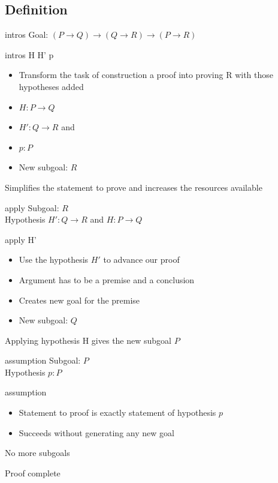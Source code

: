 \subsection{Definition}
\begin{frame}[fragile]{intros}
	Goal: $(P \rightarrow Q) \rightarrow (Q \rightarrow R) \rightarrow (P \rightarrow R)$ \\
	\medskip
	\pause
	\begin{user}
	intros H H' p
	\end{user}
	\pause
	\begin{itemize}
		\item Transform the task of construction a proof into proving R with those hypotheses added
		\pause
		\item $H:P \rightarrow Q$
		\pause
		\item $H':Q \rightarrow R$ and
		\pause
		\item $p:P$
		\pause
		\item New subgoal: $R$
	\end{itemize}
	\pause
	Simplifies the statement to prove and increases the resources available
\end{frame}
\begin{frame}[fragile]{apply}
	Subgoal: $R$\\
	\medskip
	Hypothesis $H': Q \rightarrow R$ and $H:P \rightarrow Q$
	\medskip
	\pause
	\begin{user}
	apply H'
	\end{user}
	\begin{itemize}
		\item Use the hypothesis $H'$ to advance our proof
		\pause
		\item Argument has to be a premise and a conclusion
		\pause
		\item Creates new goal for the premise
		\pause
		\item New subgoal: $Q$
	\end{itemize}
	\pause
	Applying hypothesis H gives the new subgoal $P$
\end{frame}
\begin{frame}[fragile]{assumption}
	Subgoal: $P$\\
	\medskip
	Hypothesis $p: P$
	\medskip
	\pause
	\begin{user}
	assumption
	\end{user}
	\begin{itemize}
		\item Statement to proof is exactly statement of hypothesis $p$
		\pause
		\item Succeeds without generating any new goal
	\end{itemize}
	\pause
	\medskip
	\begin{coq}
	No more subgoals
	\end{coq}
	\pause
	Proof complete
\end{frame}
